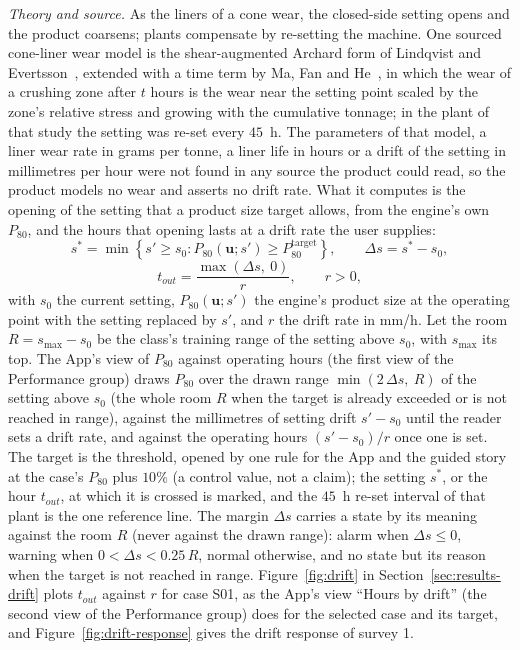 \emph{Theory and source.} As the liners of a cone wear, the closed-side setting opens and the product coarsens; plants compensate by re-setting
the machine. One sourced cone-liner wear model is the shear-augmented Archard form of Lindqvist and Evertsson~\cite{lindqvist2006}, extended
with a time term by Ma, Fan and He~\cite{ma2016}, in which the wear of a crushing zone after $t$ hours is the wear near the setting point scaled by
the zone's relative stress and growing with the cumulative tonnage; in the plant of that study the setting was re-set every $45$~h. The parameters
of that model, a liner wear rate in grams per tonne, a liner life in hours or a drift of the setting in millimetres per hour were not found in any
source the product could read, so the product models no wear and asserts no drift rate. What it computes is the opening of the setting that a
product size target allows, from the engine's own $P_{80}$, and the hours that opening lasts at a drift rate the user supplies:
\begin{equation}
s^{\ast} = \min\left\{ s' \ge s_0 : P_{80}(\mathbf u; s') \ge P_{80}^{\mathrm{target}} \right\},\qquad
\Delta s = s^{\ast} - s_0,
\label{eq:target}
\end{equation}
\begin{equation}
t_{out} = \frac{\max(\Delta s,\ 0)}{r},\qquad r > 0 ,
\label{eq:hours}
\end{equation}
with $s_0$ the current setting, $P_{80}(\mathbf u;s')$ the engine's product size at the operating point with the setting replaced by $s'$, and
$r$ the drift rate in mm/h. Let the room $R=s_{\max}-s_0$ be the class's training range of the setting above $s_0$, with $s_{\max}$ its top.
The App's view of $P_{80}$ against operating hours (the first view of the Performance group) draws $P_{80}$ over the drawn range
$\min(2\,\Delta s,\ R)$ of the setting above $s_0$ (the whole room $R$ when the target is already exceeded or is not reached in range),
against the millimetres of setting drift $s'-s_0$ until the reader sets a drift rate, and against the operating hours $(s'-s_0)/r$ once
one is set. The target is the threshold, opened by one rule for the App and the
guided story at the case's $P_{80}$ plus $10\%$ (a control value, not a claim); the setting $s^{\ast}$, or the hour $t_{out}$, at which it is
crossed is marked, and the $45$~h re-set interval of that plant is the one reference line. The margin $\Delta s$ carries a state by its meaning
against the room $R$ (never against the drawn range): alarm when $\Delta s \le 0$, warning when $0 < \Delta s < 0.25\,R$, normal
otherwise, and no state but its reason when the target is not reached in range. Figure~\ref{fig:drift} in Section~\ref{sec:results-drift}
plots $t_{out}$ against $r$ for case S01, as the App's view ``Hours by drift'' (the second view of the Performance group) does for the
selected case and its target, and Figure~\ref{fig:drift-response} gives the drift response of survey 1.

